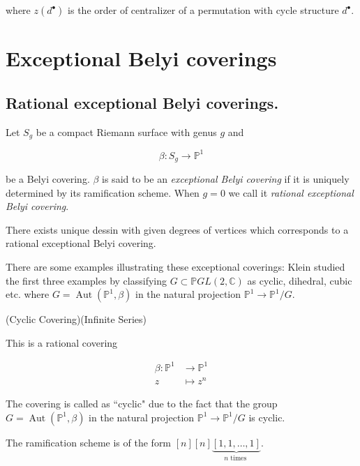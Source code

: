 where $z\left(d^{\bullet}\right)$ is the order of centralizer of a permutation with cycle structure $d^{\bullet}$.

\section{Exceptional Belyi coverings}


\subsection{Rational exceptional Belyi coverings.}

\begin{dfn}
    Let $S_{g}$ be a compact Riemann surface with genus $g$ and

$$
\beta: S_{g} \rightarrow \mathbb{P}^{1}
$$

be a Belyi covering. $\beta$ is said to be an \textit{exceptional Belyi covering} if it is uniquely determined by its ramification scheme. When $g=0$ we call it \textit{rational exceptional Belyi covering}.
\end{dfn}

\begin{rem}
    There exists unique dessin with given degrees of vertices which corresponds to a rational exceptional Belyi covering.
\end{rem}

There are some examples illustrating these exceptional coverings: Klein studied the first three examples by classifying $G \subset \mathbb{P} G L(2, \mathbb{C})$ as cyclic, dihedral, cubic etc. where $G=\operatorname{Aut}\left(\mathbb{P}^{1}, \beta\right)$ in the natural projection $\mathbb{P}^{1} \rightarrow \mathbb{P}^{1} / G$.

\begin{example}(Cyclic Covering)(Infinite Series) 

This is a rational covering

$$
\begin{aligned}
\beta: \mathbb{P}^{1} & \rightarrow \mathbb{P}^{1} \\
z & \mapsto z^{n}
\end{aligned}
$$

The covering is called as ``cyclic" due to the fact that the group $G=\operatorname{Aut}\left(\mathbb{P}^{1}, \beta\right)$ in the natural projection $\mathbb{P}^{1} \rightarrow \mathbb{P}^{1} / G$ is cyclic.

The ramification scheme is of the form $[n][n] \underbrace{[1,1, \ldots, 1]}_{n \text { times }}$.

\end{example}

